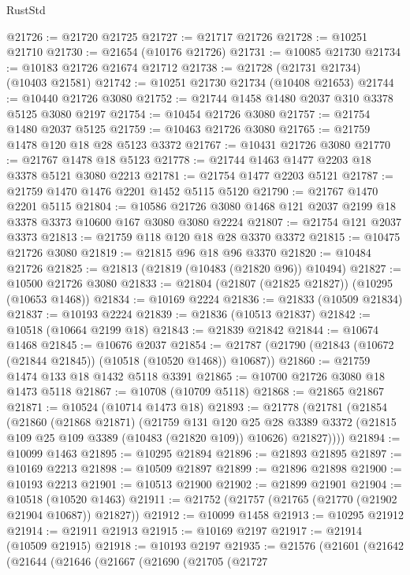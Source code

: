 \begin{lexlean}{RustStd}
\begin{coremodule}
@21726 := @21720 @21725
@21727 := @21717 @21726
@21728 := @10251 @21710
@21730 := @21654 (@10176 @21726)
@21731 := @10085 @21730
@21734 := @10183 @21726 @21674 @21712
@21738 := @21728 (@21731 @21734) (@10403 @21581)
@21742 := @10251 @21730 @21734 (@10408 @21653)
@21744 := @10440 @21726 @3080
@21752 := @21744 @1458 @1480 @2037 @310 @3378 @5125 @3080 @2197
@21754 := @10454 @21726 @3080
@21757 := @21754 @1480 @2037 @5125
@21759 := @10463 @21726 @3080
@21765 := @21759 @1478 @120 @18 @28 @5123 @3372
@21767 := @10431 @21726 @3080
@21770 := @21767 @1478 @18 @5123
@21778 := @21744 @1463 @1477 @2203 @18 @3378 @5121 @3080 @2213
@21781 := @21754 @1477 @2203 @5121
@21787 := @21759 @1470 @1476 @2201 @1452 @5115 @5120
@21790 := @21767 @1470 @2201 @5115
@21804 := @10586 @21726 @3080 @1468 @121 @2037 @2199 @18 @3378 @3373 @10600 @167 @3080 @3080 @2224
@21807 := @21754 @121 @2037 @3373
@21813 := @21759 @118 @120 @18 @28 @3370 @3372
@21815 := @10475 @21726 @3080
@21819 := @21815 @96 @18 @96 @3370
@21820 := @10484 @21726
@21825 := @21813 (@21819 (@10483 (@21820 @96)) @10494)
@21827 := @10500 @21726 @3080
@21833 := @21804 (@21807 (@21825 @21827)) (@10295 (@10653 @1468))
@21834 := @10169 @2224
@21836 := @21833 (@10509 @21834)
@21837 := @10193 @2224
@21839 := @21836 (@10513 @21837)
@21842 := @10518 (@10664 @2199 @18)
@21843 := @21839 @21842
@21844 := @10674 @1468
@21845 := @10676 @2037
@21854 := @21787 (@21790 (@21843 (@10672 (@21844 @21845)) (@10518 (@10520 @1468)) @10687))
@21860 := @21759 @1474 @133 @18 @1432 @5118 @3391
@21865 := @10700 @21726 @3080 @18 @1473 @5118
@21867 := @10708 (@10709 @5118)
@21868 := @21865 @21867
@21871 := @10524 (@10714 @1473 @18)
@21893 := @21778
    (@21781
      (@21854
        (@21860
          (@21868 @21871)
          (@21759
            @131
            @120
            @25
            @28
            @3389
            @3372
            (@21815 @109 @25 @109 @3389 (@10483 (@21820 @109)) @10626)
            @21827))))
@21894 := @10099 @1463
@21895 := @10295 @21894
@21896 := @21893 @21895
@21897 := @10169 @2213
@21898 := @10509 @21897
@21899 := @21896 @21898
@21900 := @10193 @2213
@21901 := @10513 @21900
@21902 := @21899 @21901
@21904 := @10518 (@10520 @1463)
@21911 := @21752 (@21757 (@21765 (@21770 (@21902 @21904 @10687)) @21827))
@21912 := @10099 @1458
@21913 := @10295 @21912
@21914 := @21911 @21913
@21915 := @10169 @2197
@21917 := @21914 (@10509 @21915)
@21918 := @10193 @2197
@21935 := @21576
    (@21601
      (@21642
        (@21644
          (@21646
            (@21667
              (@21690
                (@21705
                  (@21727

\end{coremodule}
\end{lexlean}
